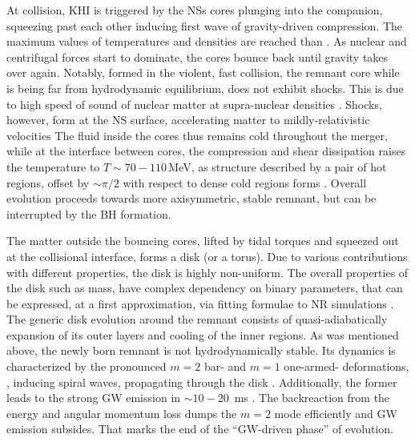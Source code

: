 At collision, \ac{KHI} is triggered by the \acp{NS} cores plunging into the companion,
squeezing past each other inducing first wave of gravity-driven compression. 
The maximum values of temperatures and densities are reached than \citep{Perego:2019adq}. 
As nuclear and centrifugal forces start to dominate, the cores bounce back until gravity 
takes over again. 
%
Notably, formed in the violent, fast collision, the remnant core while is being far from 
hydrodynamic equilibrium, does not exhibit shocks. This is due to high speed of sound 
of nuclear matter at supra-nuclear densities 
.
Shocks, however, form at the \ac{NS} surface, accelerating matter to mildly-relativistic 
velocities %
The fluid inside the cores thus remains cold 
throughout the merger, while at the interface between cores, the compression and shear 
dissipation raises the temperature to $T{\sim}70-110\,$MeV, 
as structure described by a pair of hot regions, offset by $\sim\pi/2$ with 
respect to dense cold regions forms \citep{Kastaun:2016yaf}.
%
Overall evolution proceeds towards more axisymmetric, stable remnant, but can be 
interrupted by the \ac{BH} formation. 

The matter outside the bouncing cores, lifted by tidal torques and squeezed out at the 
collisional interface, forms a disk (or a torus).
Due to various contributions with different properties, the disk is highly non-uniform.
The overall properties of the disk such as mass, have complex dependency on 
binary parameters, that can be expressed, at a first approximation, via fitting 
formulae to \ac{NR} simulations \citep{Radice:2017lry,Radice:2018xqa,Radice:2018ozg}. 
The generic disk evolution around the remnant consists of quasi-adiabatically expansion
of its outer layers 
and cooling of the inner regions. 
%
As was mentioned above, the newly born remnant is not hydrodynamically stable. 
Its dynamics is characterized by the pronounced $m=2$ bar- and $m=1$ one-armed-
deformations, , inducing spiral waves, propagating through the 
disk . Additionally, the former leads to the strong \ac{GW} emission 
in ${\sim}10-20$~ms \pmerg{}. The backreaction from the energy and angular momentum 
loss dumps the $m=2$ mode efficiently and \ac{GW} emission subsides. 
That marks the end of the ``\ac{GW}-driven phase'' of \pmerg{} evolution. 

